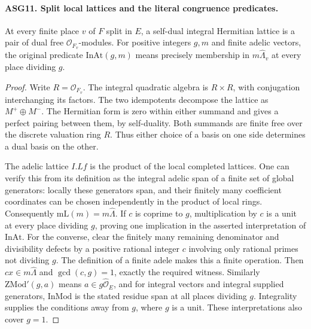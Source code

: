 \paragraph{ASG11. Split local lattices and the literal congruence predicates.}
\label{claim:ASG11}
At every finite place \(v\) of \(F\) split in \(E\), a
self-dual integral Hermitian lattice is a pair of dual free
\(\mathcal O_{F_v}\)-modules.  For positive integers \(g,m\)
and finite adelic vectors, the original predicate
\(\mathrm{InAt}(g,m)\) means precisely membership
in \(m\widehat\Lambda_v\) at every place dividing \(g\).
\begin{proof}
Write \(R=\mathcal O_{F_v}\).  The integral quadratic algebra
is \(R\times R\), with conjugation interchanging its factors.
The two idempotents decompose the lattice as \(M^+\oplus M^-\).
The Hermitian form is zero within either summand and gives a perfect
pairing between them, by self-duality.  Both summands are finite free
over the discrete valuation ring \(R\).  Thus either choice of a
basis on one side determines a dual basis on the other.

The adelic lattice \(I.Lf\) is the product of the local completed
lattices.  One can verify this from its definition as the integral
adelic span of a finite set of global generators: locally these
generators span, and their finitely many coefficient coordinates can
be chosen independently in the product of local rings.
Consequently \(\mathrm{mL}(m)=m\widehat\Lambda\).
If \(c\) is coprime to \(g\), multiplication by \(c\) is a
unit at every place dividing \(g\), proving one implication in
the asserted interpretation of \(\mathrm{InAt}\).
For the converse, clear the finitely many remaining denominator and
divisibility defects by a positive rational integer \(c\) involving
only rational primes not dividing \(g\).  The definition of a
finite adele makes this a finite operation.  Then
\(c x\in m\widehat\Lambda\) and \(\gcd(c,g)=1\), exactly
the required witness.  Similarly \(\mathrm{ZMod'}(g,a)\)
means \(a\in g\widehat{\mathcal O}_E\), and
for integral vectors and integral supplied generators,
\(\mathrm{InMod}\) is the stated residue span at all places
dividing \(g\).  Integrality supplies the conditions away from
\(g\), where \(g\) is a unit.  These interpretations also
cover \(g=1\).
\end{proof}

